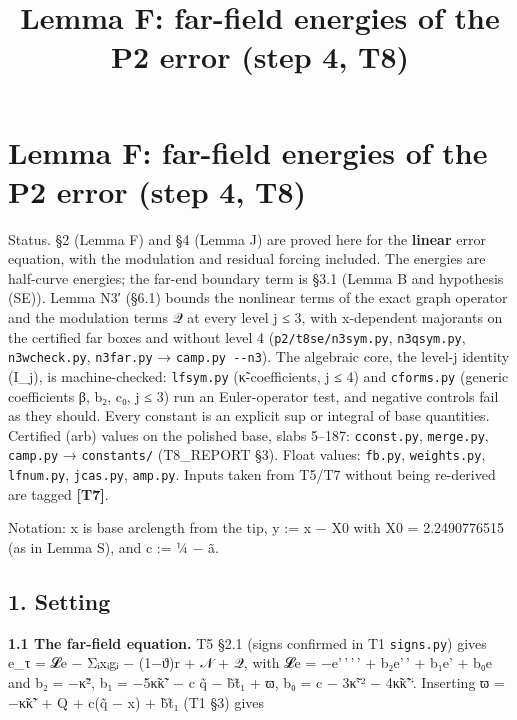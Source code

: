 \documentclass[
]{article}
\title{Lemma F: far-field energies of the P2 error (step 4, T8)}
\author{}
\date{}
\begin{document}
\maketitle

\hypertarget{lemma-f-far-field-energies-of-the-p2-error-step-4-t8}{%
\section{Lemma F: far-field energies of the P2 error (step 4,
T8)}\label{lemma-f-far-field-energies-of-the-p2-error-step-4-t8}}

Status. §2 (Lemma F) and §4 (Lemma J) are proved here for the
\textbf{linear} error equation, with the modulation and residual forcing
included. The energies are half-curve energies; the far-end boundary
term is §3.1 (Lemma B and hypothesis (SE)). Lemma N3′ (§6.1) bounds the
nonlinear terms of the exact graph operator and the modulation terms 𝒬
at every level j ≤ 3, with x-dependent majorants on the certified far
boxes and without level 4 (\texttt{p2/t8se/n3sym.py},
\texttt{n3qsym.py}, \texttt{n3wcheck.py}, \texttt{n3far.py} →
\texttt{camp.py\ -\/-n3}). The algebraic core, the level-j identity
(I\_j), is machine-checked: \texttt{lfsym.py} (κ̃-coefficients, j ≤ 4)
and \texttt{cforms.py} (generic coefficients β, b₂, c₀, j ≤ 3) run an
Euler-operator test, and negative controls fail as they should. Every
constant is an explicit sup or integral of base quantities. Certified
(arb) values on the polished base, slabs 5--187: \texttt{cconst.py},
\texttt{merge.py}, \texttt{camp.py} → \texttt{constants/} (T8\_REPORT
§3). Float values: \texttt{fb.py}, \texttt{weights.py},
\texttt{lfnum.py}, \texttt{jcas.py}, \texttt{amp.py}. Inputs taken from
T5/T7 without being re-derived are tagged \textbf{{[}T7{]}}.

Notation: x is base arclength from the tip, y := x − X0 with X0 =
2.2490776515 (as in Lemma S), and c := ¼ − ã.

\hypertarget{setting}{%
\subsection{1. Setting}\label{setting}}

\textbf{1.1 The far-field equation.} T5 §2.1 (signs confirmed in T1
\texttt{signs.py}) gives e\_τ = 𝓛e − Σᵢxᵢgᵢ − (1−ϑ)r + 𝒩 + 𝒬, with 𝓛e =
−e'\,'\,'\,' + b₂e'\,' + b₁e' + b₀e and b₂ = −κ̃², b₁ = −5κ̃κ̃' − c q̃ − b̃t̃₁
+ ϖ, b₀ = c − 3κ̃`² − 4κ̃κ̃'`. Inserting ϖ = −κ̃κ̃' + Q + c(q̃ − x) + b̃t̃₁ (T1
§3) gives
\end{document}
